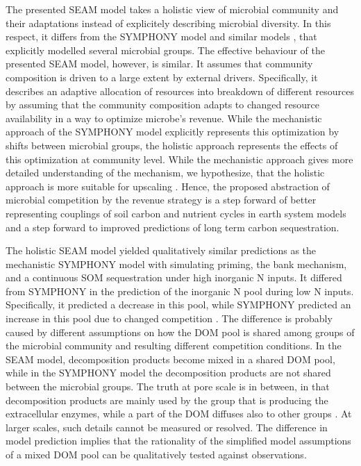 The presented SEAM model takes a holistic view \citep{Panikov10} of
microbial community and their adaptations instead of explicitely describing
microbial diversity.
In this respect, it differs from the SYMPHONY model \citep{Perveen14} and
similar models \citep{Fontaine03}, that explicitly modelled several
microbial groups.
The effective behaviour of the presented SEAM model, however, is similar.
It assumes that community composition is driven to a large extent by external
drivers. Specifically, it describes an adaptive allocation
of resources into breakdown of different resources by assuming that the
community composition adapts to changed resource availability in a way to
optimize microbe's revenue.
While the mechanistic approach of the SYMPHONY model explicitly represents this
optimization by shifts between microbial groups, the holistic approach
represents the effects of this optimization at community level.
While the mechanistic approach gives more detailed understanding of the mechanism,
we hypothesize, that the holistic approach is more suitable for upscaling
\citep{Wutzler13}.
Hence, the proposed abstraction of microbial competition by the revenue strategy
is a step forward of better representing couplings of soil carbon and nutrient
cycles in earth system models and a step forward to improved predictions of long
term carbon sequestration.

The holistic SEAM model yielded qualitatively similar predictions as the
mechanistic SYMPHONY model with simulating priming, the bank mechanism, and a
continuous SOM sequestration under high inorganic N inputs. It differed from
SYMPHONY in the prediction of the inorganic N pool during low N inputs.
Specifically, it predicted a decrease in this pool, while SYMPHONY predicted an
increase in this pool due to changed competition \citep{Perveen14}. The
difference is probably caused by different assumptions on how the DOM pool is
shared among groups of the microbial community and resulting different
competition conditions. In the SEAM model, decomposition products become mixed
in a shared DOM pool, while in the SYMPHONY model the decomposition products are
not shared between the microbial groups.
The truth at pore scale is in between, in that decomposition products are mainly
used by the group that is producing the extracellular enzymes, while a part of
the DOM diffuses also to other groups \citep{Kaiser14}. At larger scales, such
details cannot be measured or resolved. The difference in model prediction
implies that the rationality of the simplified model assumptions of a mixed
DOM pool can be qualitatively tested against observations. 

